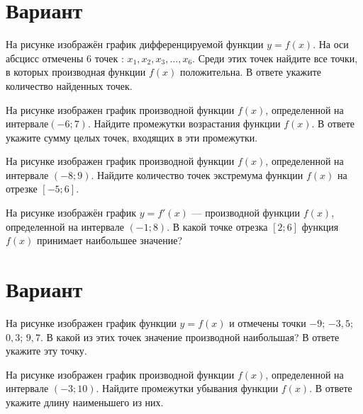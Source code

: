 \newpage\section{Вариант}\begin{taskBN}{1}
На рисунке изображён график дифференцируемой функции $y=f(x)$. На оси абсцисс отмечены 6 точек : $x_1, x_2, x_3, \dots, x_6$. Среди этих точек найдите все точки, в которых производная функции $f(x)$ положительна. В ответе укажите количество найденных точек.
\end{taskBN}

\begin{taskBN}{2}
На рисунке изображен график производной функции $f(x)$, определенной на интервале$(-6; 7)$. Найдите промежутки возрастания функции $f(x)$. В ответе укажите сумму целых точек, входящих в эти промежутки.
\end{taskBN}

\begin{taskBN}{3}
На рисунке изображен график производной функции $f(x)$, определенной на интервале $(-8;9)$. Найдите количество точек экстремума функции $f(x)$ на отрезке $[-5;6]$.
\end{taskBN}

\begin{taskBN}{4}
На рисунке изображён график $y=f'(x)$ — производной функции $f(x)$, определенной на интервале $(-1;8)$. В какой точке отрезка $[2; 6]$ функция $f(x)$ принимает наибольшее значение?
\end{taskBN}

\newpage\section{Вариант}\begin{taskBN}{1}
На рисунке изображен график функции $y=f(x)$ и отмечены точки $-9$; $-3,5$; $0,3$; $9,7$. В какой из этих точек значение производной наибольшая? В ответе укажите эту точку. 
\end{taskBN}

\begin{taskBN}{2}
На рисунке изображен график производной функции $f(x)$, определенной на интервале $(-3;10)$. Найдите промежутки убывания функции $f(x)$. В ответе укажите длину наименьшего из них.
\end{taskBN}

